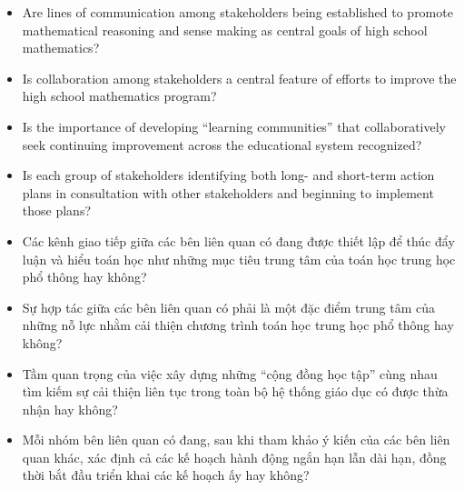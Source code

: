 \documentclass[
  10pt,
  a4paper,
  landscape,
  twoside,
  openany
]{scrbook}
\newcommand{\EN}[1]{#1}
\newcommand{\VI}[1]{#1}
\begin{document}
\TriPara
{
\EN{
  \begin{itemize}
    \item Are lines of communication among stakeholders being established to promote mathematical reasoning and sense making as central goals of high school mathematics?
    \item Is collaboration among stakeholders a central feature of efforts to improve the high school mathematics program?
    \item Is the importance of developing ``learning communities'' that collaboratively seek continuing improvement across the educational system recognized?
    \item Is each group of stakeholders identifying both long- and short-term action plans in consultation with other stakeholders and beginning to implement those plans?
  \end{itemize}}
}
{
\VI{
  \begin{itemize}
    \item Các kênh giao tiếp giữa các bên liên quan có đang được thiết lập để thúc đẩy luận và hiểu toán học như những mục tiêu trung tâm của toán học trung học phổ thông hay không?
    \item Sự hợp tác giữa các bên liên quan có phải là một đặc điểm trung tâm của những nỗ lực nhằm cải thiện chương trình toán học trung học phổ thông hay không?
    \item Tầm quan trọng của việc xây dựng những ``cộng đồng học tập'' cùng nhau tìm kiếm sự cải thiện liên tục trong toàn bộ hệ thống giáo dục có được thừa nhận hay không?
    \item Mỗi nhóm bên liên quan có đang, sau khi tham khảo ý kiến của các bên liên quan khác, xác định cả các kế hoạch hành động ngắn hạn lẫn dài hạn, đồng thời bắt đầu triển khai các kế hoạch ấy hay không?
  \end{itemize}}
}
\end{document}
